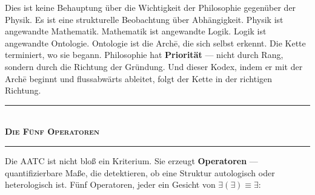 \documentclass[10pt, openany, oneside]{book}
\renewcommand{\normalsize}{\fontsize{10}{13}\selectfont}
\begin{document}
\vspace{0.8em}

\noindent Dies ist keine Behauptung über die Wichtigkeit der Philosophie gegenüber der Physik. Es ist eine strukturelle Beobachtung über Abhängigkeit. Physik ist angewandte Mathematik. Mathematik ist angewandte Logik. Logik ist angewandte Ontologie. Ontologie ist die Arch\={e}, die sich selbst erkennt. Die Kette terminiert, wo sie begann. Philosophie hat \textbf{Priorität} --- nicht durch Rang, sondern durch die Richtung der Gründung. Und dieser Kodex, indem er mit der Arch\={e} beginnt und flussabwärts ableitet, folgt der Kette in der richtigen Richtung.

\vspace{1.5em}


\begin{center}
    \rule{0.3\textwidth}{0.4pt}\\[0.5em]
    {\normalsize\bfseries\scshape Die Fünf Operatoren}\\[0.3em]
    \rule{0.3\textwidth}{0.4pt}
\end{center}

\vspace{1em}

\noindent Die AATC ist nicht bloß ein Kriterium. Sie erzeugt \textbf{Operatoren} --- quantifizierbare Maße, die detektieren, ob eine Struktur autologisch oder heterologisch ist. Fünf Operatoren, jeder ein Gesicht von $\exists(\exists) \equiv \exists$:

\vspace{0.5em}
\end{document}
